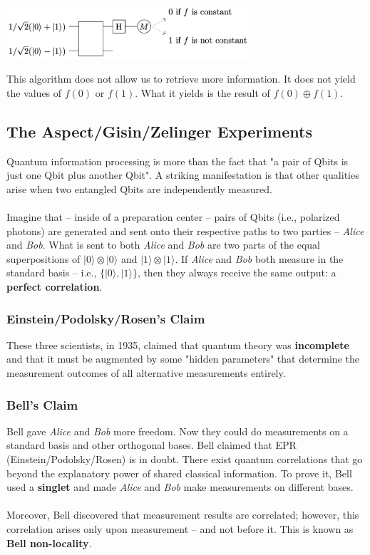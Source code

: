\documentclass{article}
\begin{document}
\begin{center}
	\includegraphics[width=9cm]{assets/deutsch2.png}
\end{center}
This algorithm does not allow us to retrieve more information. It does not yield the values of $f(0)$ or $f(1)$. What it yields is the result of $f(0) \oplus f(1)$.

\subsection{The Aspect/Gisin/Zelinger Experiments}
Quantum information processing is more than the fact that "a pair of Qbits is just one Qbit plus another Qbit". A striking manifestation is that other qualities arise when two entangled Qbits are independently measured. \\ \\
Imagine that -- inside of a preparation center -- pairs of Qbits (i.e., polarized photons) are generated and sent onto their respective paths to two parties -- \textit{Alice} and \textit{Bob}. What is sent to both \textit{Alice} and \textit{Bob} are two parts of the equal superpositions of $|0\rangle \otimes |0\rangle$ and $|1\rangle \otimes |1\rangle$. If \textit{Alice} and \textit{Bob} both measure in the standard basis -- i.e., $\{ |0\rangle, |1\rangle \}$, then they always receive the same output: a \textbf{perfect correlation}.

\subsubsection{Einstein/Podolsky/Rosen's Claim}
These three scientists, in 1935, claimed that quantum theory was \textbf{incomplete} and that it must be augmented by some "hidden parameters" that determine the measurement outcomes of all alternative measurements entirely.

\subsubsection{Bell's Claim}
Bell gave \textit{Alice} and \textit{Bob} more freedom. Now they could do measurements on a standard basis and other orthogonal bases. Bell claimed that EPR (Einstein/Podolsky/Rosen) is in doubt. There exist quantum correlations that go beyond the explanatory power of shared classical information. To prove it, Bell used a \textbf{singlet} and made \textit{Alice} and \textit{Bob} make measurements on different bases. \\ \\
Moreover, Bell discovered that measurement results are correlated; however, this correlation arises only upon measurement -- and not before it. This is known as \textbf{Bell non-locality}.
\end{document}
